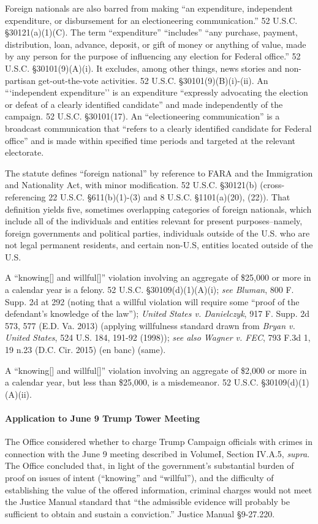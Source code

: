 Foreign nationals are also barred from making ``an expenditure, independent expenditure, or disbursement for an electioneering communication.''
52 U.S.C. \S 30121(a)(1)(C). 
The term ``expenditure'' ``includes'' ``any purchase, payment, distribution, loan, advance, deposit, or gift of money or anything of value, made by any person for the purpose of influencing any election for Federal office.'' 
52 U.S.C. \S 30101(9)(A)(i). 
It excludes, among other things, news stories and non-partisan get-out-the-vote activities. 
52 U.S.C. \S 30101(9)(B)(i)-(ii). 
An ```independent expenditure'' is an expenditure ``expressly advocating the election or defeat of a clearly identified candidate'' and made independently of the campaign. 
52 U.S.C. \S 30101(17).
An ``electioneering communication'' is a broadcast communication that ``refers to a clearly identified candidate for Federal office'' and is made within specified time periods and targeted at the relevant electorate.

The statute defines ``foreign national'' by reference to FARA and the Immigration and Nationality Act, with minor modification. 
52 U.S.C. \S 30121(b) (cross-referencing 22 U.S.C. \S 611(b)(1)-(3) and 8 U.S.C. \S 1101(a)(20), (22)). 
That definition yields five, sometimes overlapping categories of foreign nationals, which include all of the individuals and entities relevant for present purposes--namely, foreign governments and political parties, individuals outside of the U.S. who are not legal permanent residents, and certain non-U.S, entities located outside of the U.S.

A ``knowing[] and willful[]'' violation involving an aggregate of \$25,000 or more in a calendar year is a felony. 
52 U.S.C. \S 30109(d)(1)(A)(i); \textit{see Bluman}, 800 F. Supp. 2d at 292 (noting that a willful violation will require some ``proof of the defendant's knowledge of the law''); \textit{United States v. Danielczyk}, 917 F. Supp. 2d 573, 577 (E.D. Va. 2013) (applying willfulness standard drawn from \textit{Bryan v. United States}, 524 U.S. 184, 191-92 (1998)); \textit{see also Wagner v. FEC}, 793 F.3d 1, 19 n.23 (D.C. Cir. 2015) (en banc) (same). 

A ``knowing[] and willful[]'' violation involving an aggregate of \$2,000 or more in a calendar year, but less than \$25,000, is a misdemeanor. 
52 U.S.C. \S 30109(d)(1)(A)(ii).

\paragraph{Application to June 9 Trump Tower Meeting}
The Office considered whether to charge Trump Campaign officials with crimes in connection with the June 9 meeting described in VolumeI, Section IV.A.5, \textit{supra}. 
The Office concluded that, in light of the government's substantial burden of proof on issues of intent (``knowing'' and ``willful''), and the difficulty of establishing the value of the offered information, criminal charges would not meet the Justice Manual standard that ``the admissible evidence will probably be sufficient to obtain and sustain a conviction.''
Justice Manual \S 9-27.220.

